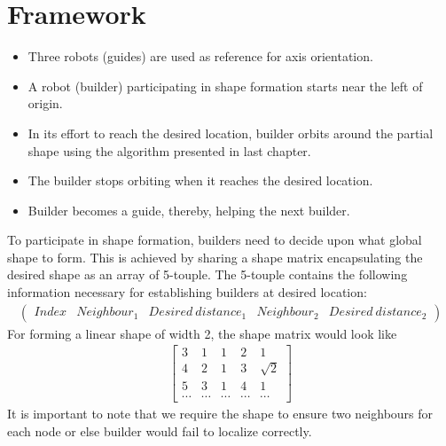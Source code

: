 \documentclass{report}[12pt]
\begin{document}
\section{Framework}
\begin{itemize}
        \item Three robots (guides) are used as reference for axis orientation.
        \item A robot (builder) participating in shape formation starts near the left of origin.
        \item In its effort to reach the desired location, builder orbits around the partial shape using the algorithm presented in last chapter.
        \item The builder stops orbiting when it reaches the desired location.
        \item Builder becomes a guide, thereby, helping the next builder.
\end{itemize}
To participate in shape formation, builders need to decide upon what global shape to form. This is achieved by sharing a shape matrix encapsulating the desired shape as an array of 5-touple. The 5-touple contains the following information necessary for establishing builders at desired location:
\begin{align}
\left(
\begin{matrix}
    Index & Neighbour_1 & Desired\ distance_1 & Neighbour_2 & Desired\ distance_2
\end{matrix}
\right)
\end{align}
For forming a linear shape of width 2, the shape matrix would look like
\begin{align}
\label{eq:shape_matrix_linear}
\begin{bmatrix}
    3 & 1 & 1 & 2 & 1\\
    4 & 2 & 1 & 3 & \sqrt{2}\\
    5 & 3 & 1 & 4 & 1\\
    \cdots & \cdots & \cdots & \cdots & \cdots
\end{bmatrix}
\end{align}
It is important to note that we require the shape to ensure two neighbours for each node or else builder would fail to localize correctly.
\end{document}
